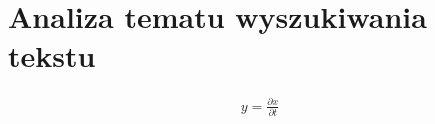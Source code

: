 \chapter{Analiza tematu wyszukiwania tekstu}  %
% 


%
\begin{align}
    y = \frac{\partial x}{\partial t}
\end{align}
%
%

%
%
